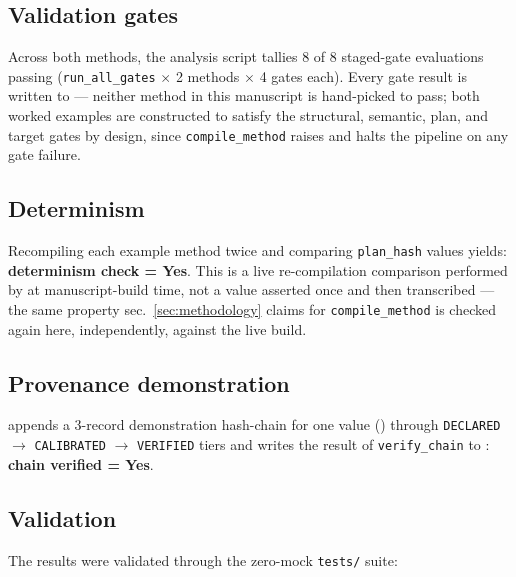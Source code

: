 \documentclass[
  english,
]{article}
\begin{document}
\subsection{Validation gates}\label{validation-gates}

Across both methods, the analysis script tallies 8 of 8 staged-gate
evaluations passing (\texttt{run\_all\_gates} \texorpdfstring{\ensuremath{\times}}{x} 2 methods \texorpdfstring{\ensuremath{\times}}{x} 4 gates
each). Every gate result is written to
 --- neither method in this
manuscript is hand-picked to pass; both worked examples are constructed
to satisfy the structural, semantic, plan, and target gates by design,
since \texttt{compile\_method} raises  and
halts the pipeline on any gate failure.

\subsection{Determinism}\label{determinism}

Recompiling each example method twice and comparing \texttt{plan\_hash}
values yields: \textbf{determinism check = Yes}. This is a live
re-compilation comparison performed by
 at manuscript-build time, not a
value asserted once and then transcribed --- the same property
sec.~\ref{sec:methodology} claims for \texttt{compile\_method} is
checked again here, independently, against the live build.

\subsection{Provenance demonstration}\label{provenance-demonstration}

 appends a 3-record demonstration
hash-chain for one value () through
\texttt{DECLARED} \texorpdfstring{\ensuremath{\to}}{->} \texttt{CALIBRATED} \texorpdfstring{\ensuremath{\to}}{->} \texttt{VERIFIED} tiers and
writes the result of \texttt{verify\_chain} to
: \textbf{chain
verified = Yes}.

\subsection{Validation}\label{validation}

The results were validated through the zero-mock \texttt{tests/} suite:
\end{document}
